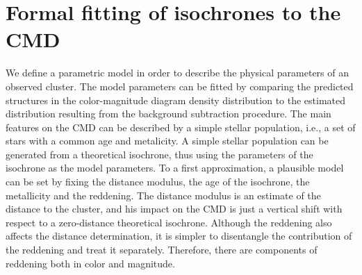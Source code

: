 \documentclass[11pt,twoside
]{article}
\begin{document}
\section{Formal fitting of isochrones to the CMD}


We define a parametric model in order to describe the physical
parameters of an observed cluster. The model parameters can be fitted
by comparing the predicted structures in the color-magnitude diagram
density distribution to the estimated distribution resulting from the
background subtraction procedure. The main features on the CMD can be
described by a simple stellar population, i.e., a set of stars with a
common age and metalicity. A simple stellar population can be
generated from a theoretical isochrone, thus using the parameters of
the isochrone as the model parameters. To a first approximation, a
plausible model can be set by fixing the distance modulus, the age of
the isochrone, the metallicity and the reddening. The distance modulus
is an estimate of the distance to the cluster, and his impact on the
CMD is just a vertical shift with respect to a zero-distance
theoretical isochrone. Although the reddening also affects the
distance determination, it is simpler to disentangle the contribution
of the reddening and treat it separately.  Therefore, there are
components of reddening both in color and magnitude.
\end{document}
